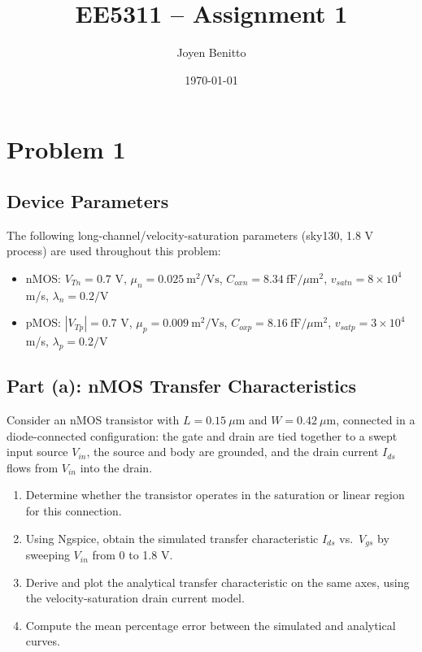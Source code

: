 \title{EE5311 -- Assignment 1}
\author{Joyen Benitto}
\date{\today}
\maketitle

\section{Problem 1}

\subsection*{Device Parameters}

The following long-channel/velocity-saturation parameters (sky130, 1.8 V process) are used throughout this problem:

\begin{itemize}
  \item nMOS: $V_{Tn} = 0.7$ V, $\mu_n = 0.025\ \text{m}^2/\text{Vs}$, $C_{oxn} = 8.34\ \text{fF}/\mu\text{m}^2$, $v_{satn} = 8\times10^4$ m/s, $\lambda_n = 0.2/\text{V}$
  \item pMOS: $|V_{Tp}| = 0.7$ V, $\mu_p = 0.009\ \text{m}^2/\text{Vs}$, $C_{oxp} = 8.16\ \text{fF}/\mu\text{m}^2$, $v_{satp} = 3\times10^4$ m/s, $\lambda_p = 0.2/\text{V}$
\end{itemize}

\subsection{Part (a): nMOS Transfer Characteristics}

Consider an nMOS transistor with $L = 0.15\ \mu\text{m}$ and $W = 0.42\ \mu\text{m}$, connected in a diode-connected configuration: the gate and drain are tied together to a swept input source $V_{in}$, the source and body are grounded, and the drain current $I_{ds}$ flows from $V_{in}$ into the drain.

\begin{enumerate}
  \item Determine whether the transistor operates in the saturation or linear region for this connection.
  \item Using Ngspice, obtain the simulated transfer characteristic $I_{ds}$ vs.\ $V_{gs}$ by sweeping $V_{in}$ from 0 to 1.8 V.
  \item Derive and plot the analytical transfer characteristic on the same axes, using the velocity-saturation drain current model.
  \item Compute the mean percentage error between the simulated and analytical curves.
\end{enumerate}


